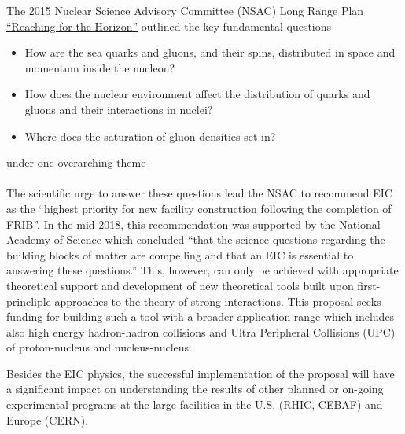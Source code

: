 
The 2015 Nuclear Science Advisory Committee (NSAC) Long Range Plan
\href{https://science.energy.gov/np/nsac/}
{``Reaching  for the Horizon''} outlined the key fundamental  questions{\it 
\begin{itemize}
	\item [] How are the sea quarks and gluons, and their spins, distributed in
		space and momentum inside the nucleon? 
	\item [ ] How does the nuclear environment affect the distribution of
		quarks and gluons and their interactions in nuclei?
	\item [] Where does the saturation of gluon densities set in?
\end{itemize}}
\noindent 
under one overarching theme \\
 \\ \noindent 
The scientific  urge to answer these questions lead the NSAC 
to recommend EIC as the ``highest priority for new facility construction
following the completion of FRIB''. In the mid 2018, this recommendation 
was supported by the National Academy of Science which  concluded 
``that the science questions
regarding the building blocks of matter are compelling and that an EIC is
essential to answering these questions.'' 
This, however, can only be achieved   
with appropriate theoretical support %
and development of new theoretical tools built upon 
first-princliple approaches  to 
the theory of strong interactions. 
This proposal seeks funding for building such a tool 
with a broader application range which includes also high energy hadron-hadron 
collisions and Ultra Peripheral Collisions (UPC) of proton-nucleus and nucleus-nucleus.   

Besides the EIC physics, 
the successful implementation of the proposal will have a significant impact on 
understanding the results of other planned or on-going experimental programs  at the large 
facilities in the U.S. (RHIC, CEBAF) and Europe (CERN). 



